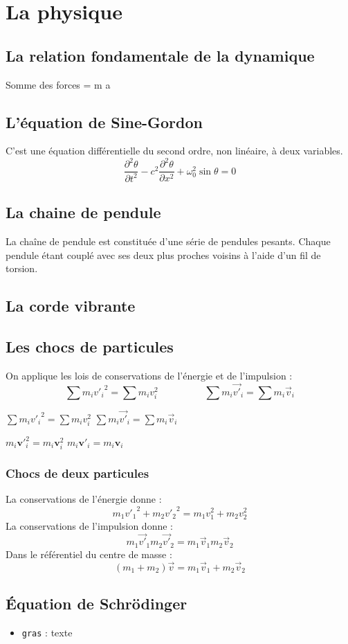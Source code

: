 %
\section{La physique}
%
\subsection{La relation fondamentale de la dynamique}
%
Somme des forces = m a
%
\subsection{L'équation de Sine-Gordon \cite{sine-gordon}}
%
C'est une équation différentielle du second ordre, non linéaire, à deux variables.
%
\[
\frac{\partial^2\theta}{\partial t^2} - c^2 \frac{\partial^2\theta}{\partial x^2} + \omega _0 ^2 \sin \theta = 0
\]
\subsection{La chaine de pendule}
%
La chaîne de pendule est constituée d'une série de pendules pesants. Chaque pendule étant couplé avec ses deux plus proches voisins à l'aide d'un fil de torsion.
%
\subsection{La corde vibrante}
%
\subsection{Les chocs de particules}
On applique les lois de conservations de l'énergie et de l'impulsion :
\[
\sum m_i{v'_i}^2=\sum m_iv_i^2
\hspace{2cm}
\sum m_i\overrightarrow{v'}_i=\sum m_i\overrightarrow{v}_i
\]
\begin{center}
$\sum m_i{v'_i}^2=\sum m_iv_i^2$
\hspace{2cm}
$\sum m_i\overrightarrow{v'}_i=\sum m_i\overrightarrow{v}_i$
\end{center}
\begin{center}
$m_i\mathbf{v'}_i^2=m_i\mathbf{v}_i^2$
\hspace{2cm}
$m_i\mathbf{v'}_i=m_i\mathbf{v}_i$
\end{center}
\subsubsection{Chocs de deux particules}
La conservations de l'énergie donne :
\[
m_1{v'_1}^2 + m_2{v'_2}^2=m_1v_1^2 + m_2v_2^2
\]
La conservations de l'impulsion donne :
\[
m_1\overrightarrow{v'}_1 m_2\overrightarrow{v'}_2=m_1\overrightarrow{v}_1 m_2\overrightarrow{v}_2
\]
Dans le référentiel du centre de masse : 
\[
(m_1 + m_2)\overrightarrow{v}=m_1\overrightarrow{v}_1 + m_2\overrightarrow{v}_2
\]
%
\subsection{Équation de Schrödinger}
%

\begin{itemize}[leftmargin=2cm]
\item \texttt{gras} : texte
\end{itemize}



